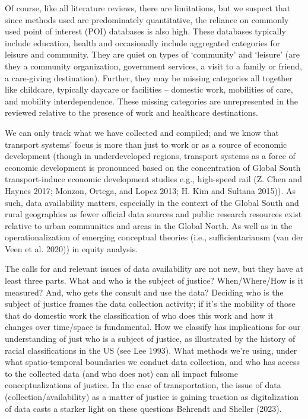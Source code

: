 \documentclass[12pt, oneside]{report}
\begin{document}
Of course, like all literature reviews, there are limitations, but we
suspect that since methods used are predominately quantitative, the
reliance on commonly used point of interest (POI) databases is also
high. These databases typically include education, health and
occasionally include aggregated categories for leisure and community.
They are quiet on types of `community' and `leisure' (are they a
community organization, government services, a visit to a family or
friend, a care-giving destination). Further, they may be missing
categories all together like childcare, typically daycare or facilities
-- domestic work, mobilities of care, and mobility interdependence.
These missing categories are unrepresented in the reviewed relative to
the presence of work and healthcare destinations.

We can only track what we have collected and compiled; and we know that
transport systems' focus is more than just to work or as a source of
economic development (though in underdeveloped regions, transport
systems as a force of economic development is pronounced based on the
concentration of Global South transport-induce economic development
studies e.g., high-speed rail (Z. Chen and Haynes 2017; Monzon, Ortega,
and Lopez 2013; H. Kim and Sultana 2015)). As such, data availability
matters, especially in the context of the Global South and rural
geographies as fewer official data sources and public research resources
exist relative to urban communities and areas in the Global North. As
well as in the operationalization of emerging conceptual theories (i.e.,
sufficientariansm (van der Veen et al. 2020)) in equity analysis.

The calls for and relevant issues of data availability are not new, but
they have at least three parts. What and who is the subject of justice?
When/Where/How is it measured? And, who gets the consult and use the
data? Deciding who is the subject of justice frames the data collection
activity; if it's the mobility of those that do domestic work the
classification of who does this work and how it changes over time/space
is fundamental. How we classify has implications for our understanding
of just who is a subject of justice, as illustrated by the history of
racial classifications in the US (see Lee 1993). What methods we're
using, under what spatio-temporal boundaries we conduct data collection,
and who has access to the collected data (and who does not) can all
impact fulsome conceptualizations of justice. In the case of
transportation, the issue of data (collection/availability) as a matter
of justice is gaining traction as digitalization of data casts a starker
light on these questions Behrendt and Sheller (2023).
\end{document}
